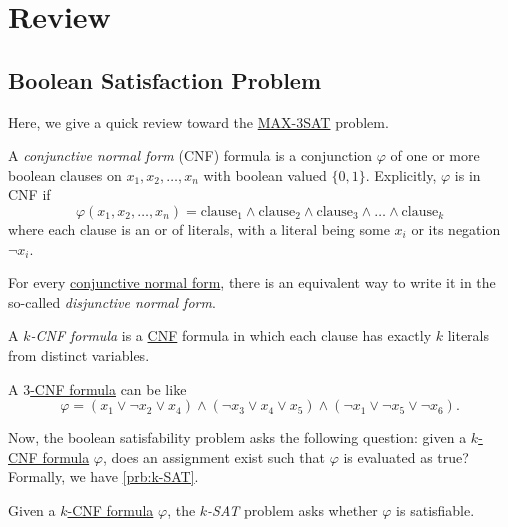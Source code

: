 \chapter{Review}
\section{Boolean Satisfaction Problem}
Here, we give a quick review toward the \hyperref[prb:max-3SAT]{MAX-3SAT} problem.

\begin{definition}\label{def:CNF}
	A \emph{conjunctive normal form} (CNF) formula is a conjunction \(\varphi\) of one or more boolean clauses on \(x_1, x_2, \dots  , x_n\) with boolean valued \(\{0, 1\}\). Explicitly, \(\varphi\) is in CNF if
	\[
		\varphi(x_1, x_2, \dots, x_n) = \text{clause}_1 \wedge \text{clause}_2 \wedge \text{clause}_3 \wedge \dots  \wedge \text{clause}_k
	\]
	where each clause is an or of literals, with a literal being some \(x_i\) or its negation \(\neg x_i\).
\end{definition}

\begin{note}
	For every \hyperref[def:CNF]{conjunctive normal form}, there is an equivalent way to write it in the so-called \emph{disjunctive normal form}.
\end{note}

\begin{definition}[\(k\)-CNF]\label{def:k-CNF}
	A \emph{\(k\)-CNF formula} is a \hyperref[def:CNF]{CNF} formula in which each clause has exactly \(k\) literals from distinct variables.
\end{definition}

\begin{eg}[3-CNF]
	A \hyperref[def:k-CNF]{\(3\)-CNF formula} can be like
	\[
		\varphi = (x_1 \vee \neg x_2 \vee x_4) \wedge (\neg x_3 \vee x_4 \vee x_5) \wedge (\neg x_1 \vee \neg x_5 \vee \neg x_6).
	\]
\end{eg}

Now, the boolean satisfability problem asks the following question: given a \hyperref[def:k-CNF]{\(k\)-CNF formula} \(\varphi \), does an assignment exist such that \(\varphi \) is evaluated as true? Formally, we have \autoref{prb:k-SAT}.

\begin{problem}[\(k\)-SAT]\label{prb:k-SAT}
Given a \hyperref[def:k-CNF]{\(k\)-CNF formula} \(\varphi\), the \emph{\(k\)-SAT} problem asks whether \(\varphi\) is satisfiable.
\end{problem}

